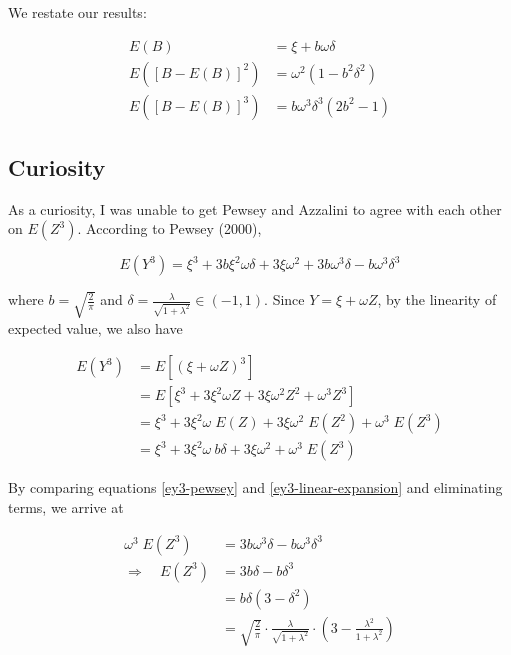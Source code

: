 \documentclass{article}
\begin{document}
We restate our results:

\begin{align}
  E(B) &= \xi + b \omega \delta \nonumber \\
  E([B - E(B)]^2) &= \omega^2 (1 - b^2 \delta^2) \\
  E([B - E(B)]^3) &= b \omega^3 \delta^3 (2b^2 - 1) \nonumber
\end{align}

\subsection{Curiosity}

As a curiosity, I was unable to get Pewsey and Azzalini to agree with each other on
$E(Z^3)$. According to Pewsey (2000),

\begin{equation} \label{ey3-pewsey}
  E(Y^3) = \xi^3 + 3 b \xi^2 \omega \delta + 3 \xi \omega^2 + 3 b \omega^3 \delta - b \omega^3 \delta^3
\end{equation}

where $b = \sqrt{\frac{2}{\pi}}$ and $\delta = \frac{\lambda}{\sqrt{1 + \lambda^2}} \in (-1,
1)$. Since $Y = \xi + \omega Z$, by the linearity of expected value, we also have

\begin{align}
  E(Y^3) &= E [(\xi + \omega Z)^3] \nonumber \\
  &= E[\xi^3 + 3 \xi^2 \omega Z + 3 \xi \omega^2 Z^2 + \omega^3 Z^3] \nonumber \\
  &= \xi^3 + 3 \xi^2 \omega\;E(Z) + 3 \xi \omega^2\;E(Z^2) + \omega^3\;E(Z^3) \nonumber \\
  &= \xi^3 + 3 \xi^2 \omega\ b \delta + 3 \xi \omega^2 + \omega^3\;E(Z^3) \label{ey3-linear-expansion}
\end{align}

By comparing equations \ref{ey3-pewsey} and \ref{ey3-linear-expansion} and eliminating terms, we
arrive at

\begin{align}
  \omega^3\;E(Z^3) &= 3 b \omega^3 \delta - b \omega^3 \delta^3 \nonumber \\
  \Rightarrow \quad E(Z^3) &= 3 b \delta - b \delta^3 \nonumber \\
  &= b \delta (3 - \delta^2) \nonumber \\
  &= \sqrt{\frac{2}{\pi}} \cdot \frac{\lambda}{\sqrt{1 + \lambda^2}} \cdot \left( 3 -
    \frac{\lambda^2}{1 + \lambda^2} \right)
\end{align}
\end{document}
